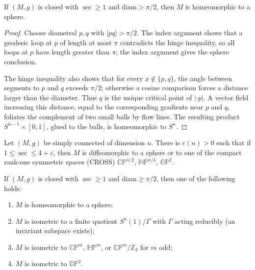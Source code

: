 \begin{theorem}
  \label{thm:pet-ch12-diameter-sphere}
  If $(M,g)$ is closed with $\sec\ge1$ and $\mathrm{diam}>\pi/2$, then $M$ is
  homeomorphic to a sphere.
\end{theorem}
\begin{proof}
  \sketch
  Choose diametral \(p,q\) with \(|pq|>\pi/2\). The index argument shows that a geodesic
  loop at \(p\) of length at most \(\pi\) contradicts the hinge inequality,
  so all loops at \(p\) have length greater than \(\pi\); the index argument
  gives the sphere conclusion.

  The hinge inequality also shows that for every \(x\notin\{p,q\}\), the
  angle between segments to \(p\) and \(q\) exceeds \(\pi/2\); otherwise a
  cosine comparison forces a distance larger than the diameter. Thus \(q\) is the
  unique critical point of \( |\cdot p| \). A vector field increasing this
  distance, equal to the corresponding gradients near \(p\) and \(q\), foliates
  the complement of two small balls by flow lines. The resulting product
  \(S^{n-1}\times[0,1]\), glued to the balls, is homeomorphic to \(S^n\).
\end{proof}

\begin{theorem}
  \label{thm:pet-ch12-cross-pinching}
  Let $(M,g)$ be simply connected of dimension $n$. There is $\varepsilon(n)>0$
  such that if $1\le\sec\le4+\varepsilon$, then $M$ is diffeomorphic to a sphere
  or to one of the compact rank-one symmetric spaces (CROSS) $\mathbb{CP}^{n/2}$,
  $\mathbb{HP}^{n/4}$, $\mathbb{OP}^2$.
\end{theorem}

\begin{theorem}
  \label{thm:pet-ch12-diameter-classification}
  If $(M,g)$ is closed with $\sec\ge1$ and $\mathrm{diam}\ge\pi/2$, then one of
  the following holds:
  \begin{enumerate}
    \item $M$ is homeomorphic to a sphere;
    \item $M$ is isometric to a finite quotient $S^n(1)/\Gamma$ with $\Gamma$
      acting reducibly (an invariant subspace exists);
    \item $M$ is isometric to $\mathbb{CP}^m$, $\mathbb{HP}^m$, or
      $\mathbb{CP}^m/\mathbb{Z}_2$ for $m$ odd;
    \item $M$ is isometric to $\mathbb{OP}^2$.
  \end{enumerate}
\end{theorem}

